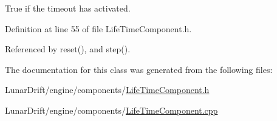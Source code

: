 True if the timeout has activated. 



Definition at line 55 of file Life\+Time\+Component.\+h.



Referenced by reset(), and step().



The documentation for this class was generated from the following files\+:\begin{DoxyCompactItemize}
\item 
Lunar\+Drift/engine/components/\hyperlink{_life_time_component_8h}{Life\+Time\+Component.\+h}\item 
Lunar\+Drift/engine/components/\hyperlink{_life_time_component_8cpp}{Life\+Time\+Component.\+cpp}\end{DoxyCompactItemize}

